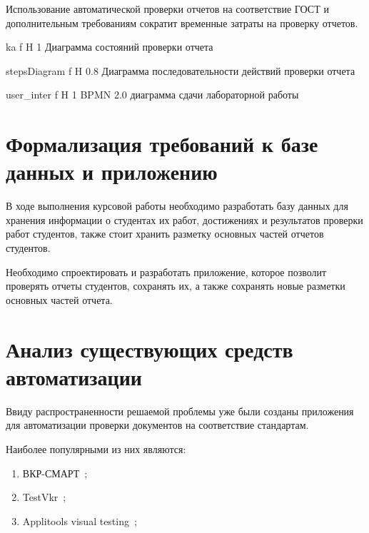 Использование автоматической проверки отчетов на соответствие ГОСТ и дополнительным требованиям сократит временные затраты на проверку отчетов.


{ka} %
{f} %
{H} %
{1\textwidth} %
{Диаграмма состояний проверки отчета} %

{stepsDiagram} %
{f} %
{H} %
{0.8\textwidth} %
{Диаграмма последовательности действий проверки отчета} %

{user_inter} %
{f} %
{H} %
{1\textwidth} %
{BPMN 2.0 диаграмма сдачи лабораторной работы} %


\section{Формализация требований к базе данных и приложению}
В ходе выполнения курсовой работы необходимо разработать базу данных для хранения информации о студентах их работ, достижениях и результатов проверки работ студентов, также стоит хранить разметку основных частей отчетов студентов.

Необходимо спроектировать и разработать приложение, которое позволит проверять отчеты студентов, сохранять их, а также сохранять новые разметки основных частей отчета.


\section{Анализ существующих средств автоматизации}
Ввиду распространенности решаемой проблемы уже были созданы приложения для автоматизации проверки документов на соответствие стандартам.

Наиболее популярными из них являются:
\begin{enumerate}
	\item ВКР-СМАРТ~\cite{VKR_VYZ};
	\item TestVkr~\cite{TestVkr};
	\item Applitools visual testing~\cite{PdfTest};
\end{enumerate}

